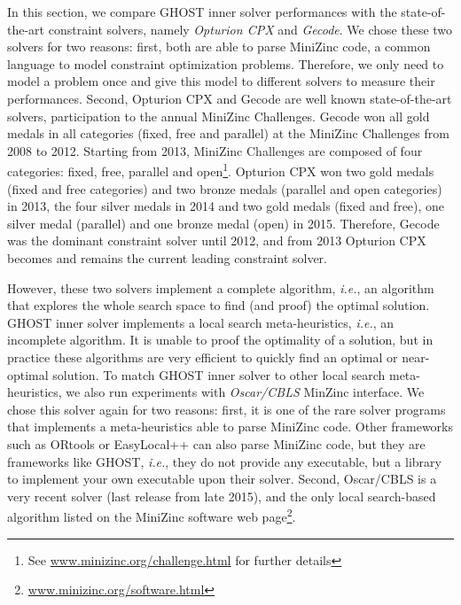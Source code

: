 \documentclass[journal]{IEEEtran}
\newcommand{\ghost}{\textsc{GHOST}\xspace}
\newcommand{\ie}{\textit{i.e.}}
\begin{document}
In this section, we compare  \ghost inner solver performances with the
state-of-the-art  constraint solvers,  namely {\it  Opturion CPX}  and
{\it Gecode}.  We chose these  two solvers  for two reasons:  first, both
are able to parse MiniZinc code, a common language to model constraint
optimization problems. Therefore, we only need to model a problem once
and  give   this  model   to  different   solvers  to   measure  their
performances.   Second,   Opturion   CPX   and  Gecode   are   well   known
state-of-the-art  solvers,   participation  to  the   annual  MiniZinc
Challenges.   Gecode won  all gold  medals in  all categories  (fixed,
free and parallel) at the
MiniZinc Challenges from  2008 to 2012.  Starting  from 2013, MiniZinc
Challenges are composed of four  categories: fixed, free, parallel and
open\footnote{See
  \href{http://www.minizinc.org/challenge.html}{www.minizinc.org/challenge.html}
  for further details}. Opturion CPX won two gold
medals (fixed  and free  categories) and  two bronze  medals (parallel
and open categories)  in 2013, the four silver medals  in 2014 and two
gold  medals (fixed  and free),  one silver  medal (parallel)  and one
bronze  medal  (open) in  2015.  Therefore,  Gecode was  the  dominant
constraint solver until  2012, and from 2013 Opturion  CPX becomes and
remains the current leading constraint solver.

However, these  two solvers implement  a complete algorithm,  \ie, an
algorithm that explores  the whole  search space to  find (and  proof) the
optimal  solution.   \ghost inner  solver  implements  a local  search
meta-heuristics, \ie, an  incomplete algorithm. It is  unable to proof
the optimality  of a  solution, but in  practice these  algorithms are
very efficient to quickly find an optimal or near-optimal solution. To
match \ghost inner solver to other local search meta-heuristics, we
also run experiments  with {\it  Oscar/CBLS} MinZinc interface.   We chose
this solver  again for two  reasons: first, it is  one of the  rare solver
programs that implements   a  meta-heuristics  able  to   parse  MiniZinc
code. Other frameworks such as  ORtools or EasyLocal++ can also parse
MiniZinc code,  but they are frameworks like  \ghost, \ie, they  do not
provide  any   executable,  but a library  to   implement  your  own
executable upon their solver.
Second, Oscar/CBLS is  a very recent
solver (last release from late  2015), and the only local search-based
algorithm     listed     on      the     MiniZinc     software     web
page\footnote{\href{http://www.minizinc.org/software.html}{www.minizinc.org/software.html}}.
\end{document}
